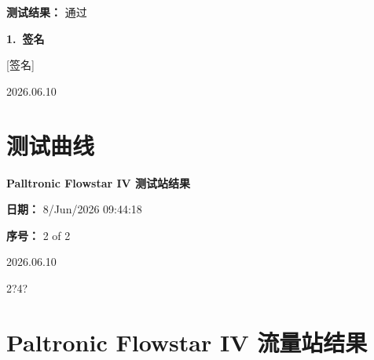 \documentclass[UTF8,10pt,a4paper,fontset=fandol]{ctexart}
\newcommand{\fieldvalue}[1]{#1}
\newcommand{\handwritten}[1]{#1}
\begin{document}
\textbf{测试结果：} 通过

\vspace{1em}

\textbf{1.\ 签名}

\fieldvalue{\handwritten{[签名]}}

\vspace{1em}

\handwritten{2026.06.10}

\section{测试曲线}

\textbf{Palltronic Flowstar IV 测试站结果}

\textbf{日期：}
\fieldvalue{8/Jun/2026 09:44:18}

\textbf{序号：}
\fieldvalue{2 of 2}

\begin{center}
\setlength{\fboxsep}{8pt}
\end{center}

\handwritten{2026.06.10}

\handwritten{2?4?}

\newpage

\section*{Paltronic Flowstar IV 流量站结果}
\end{document}
